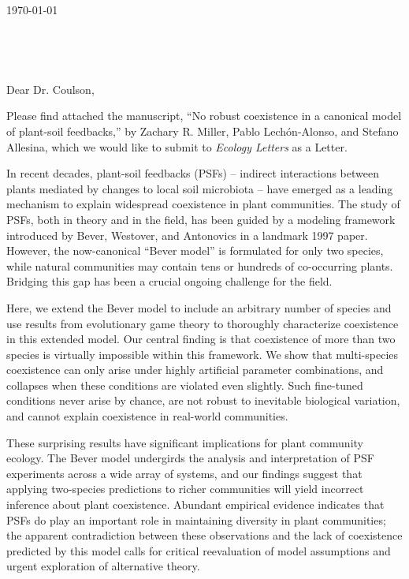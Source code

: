 \documentclass[11pt]{letter}
\renewcommand{\opening}[1]{
	{\centering\noindent\fromaddress\vspace{0.05\textheight} \\ %
	\hspace*{\longindentation}
	\hspace*{\fill}\par} %
	{\raggedright \toname \\ \toaddress \par} %
	\vspace{0.5cm} %
	\noindent #1 %
}
\begin{document}

\begin{letter}{

	\today
}


\opening{Dear Dr. Coulson,}

\frenchspacing

Please find attached the manuscript, ``No robust coexistence in a canonical model of plant-soil feedbacks,'' by Zachary R.
Miller, Pablo Lech\'{o}n-Alonso, and Stefano Allesina, which we would like to submit to \textit{Ecology Letters} as a Letter.

In recent decades, plant-soil feedbacks (PSFs) -- indirect interactions between plants mediated by changes to local soil microbiota -- have emerged as a leading mechanism to explain widespread coexistence in plant communities. The study of PSFs, both in theory and in the field, has been guided by a modeling framework introduced by Bever, Westover, and Antonovics in a landmark 1997 paper. However, the now-canonical ``Bever model'' is formulated for only two species, while natural communities may contain tens or hundreds of co-occurring plants. Bridging this gap has been a crucial ongoing challenge for the field.

Here, we extend the Bever model to include an arbitrary number of species and use results from evolutionary game theory to thoroughly characterize coexistence in this extended model. Our central finding is that coexistence of more than two species is virtually impossible within this framework. We show that multi-species coexistence can only arise under highly artificial parameter combinations, and collapses when these conditions are violated even slightly. Such fine-tuned conditions never arise by chance, are not robust to inevitable biological variation, and cannot explain coexistence in real-world communities.

These surprising results have significant implications for plant community ecology. The Bever model undergirds the analysis and interpretation of PSF experiments across a wide array of systems, and our findings suggest that applying two-species predictions to richer communities will yield incorrect inference about plant coexistence. Abundant empirical evidence indicates that PSFs do play an important role in maintaining diversity in plant communities; the apparent contradiction between these observations and the lack of coexistence predicted by this model calls for critical reevaluation of model assumptions and urgent exploration of alternative theory.


\end{letter}
\end{document}
